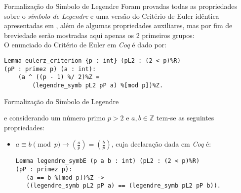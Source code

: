 \begin{frame}[fragile]{Formalização do Símbolo de Legendre}
    Foram provadas todas as propriedades sobre o \textit{símbolo de Legendre} e uma versão do Critério de Euler idêntica apresentadas em \cite{book:2399854}, além de algumas propriedades auxiliares, mas por fim de breviedade serão mostradas aqui apenas os 2 primeiros grupos:
    \vspace{4mm}
    \\
    O enunciado do Critério de Euler em \textit{Coq} é dado por:
        \begin{lstlisting}[language=coq,frame=single,tabsize=1]
Lemma eulerz_criterion {p : int} (pL2 : (2 < p)%R) 
(pP : primez p) (a : int):
    (a ^ ((p - 1) %/ 2)%Z = 
        (legendre_symb pL2 pP a) %[mod p])%Z.
        \end{lstlisting}

\end{frame}

\begin{frame}[fragile]{Formalização do Símbolo de Legendre}
    
    e considerando um número primo $p > 2$ e $a, b \in \mathbb{Z}$ tem-se as seguintes propriedades:
        
        \begin{itemize}
            \item $a \equiv b \pmod{p} \rightarrow \left(\frac{a}{p}\right) = \left(\frac{b}{p}\right)$, cuja declaração dada em \textit{Coq} é:
            \newline
                \begin{lstlisting}[language=coq,frame=single,tabsize=1]
Lemma legendre_symbE (p a b : int) (pL2 : (2 < p)%R) 
(pP : primez p):
   (a == b %[mod p])%Z -> 
   ((legendre_symb pL2 pP a) == (legendre_symb pL2 pP b)).
                \end{lstlisting}

        \end{itemize}
\end{frame}


